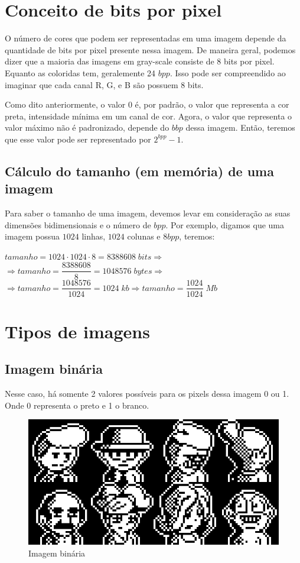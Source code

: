 \documentclass[a4paper, 12pt]{article}
\begin{document}
\section{Conceito de bits por pixel}
O número de cores que podem ser representadas em uma imagem depende da quantidade de bits por pixel presente nessa imagem.
De maneira geral, podemos dizer que a maioria das imagens em gray-scale consiste de 8 bits por pixel. Equanto as coloridas tem, geralemente 
24 $bpp$. Isso pode ser compreendido ao imaginar que cada canal R, G, e B são possuem 8 bits.

Como dito anteriormente, o valor 0 é, por padrão, o valor que representa a cor preta, intensidade mínima em um canal de cor. 
Agora, o valor que representa o valor máximo não é padronizado, depende do $bbp$ dessa imagem. Então, teremos que esse valor pode ser 
representado por $2^{bpp} - 1$.

\subsection{Cálculo do tamanho (em memória) de uma imagem}
Para saber o tamanho de uma imagem, devemos levar em consideração as suas dimensões bidimensionais e o número de $bpp$. Por exemplo, digamos que 
uma imagem possua $1024$ linhas, $1024$ colunas e $8 bpp$, teremos:
\begin{center}
	$tamanho = 1024 \cdot 1024 \cdot 8 = 8388608 \; bits  \Rightarrow$ 
	\\
	\vspace*{0.15cm}
	$\Rightarrow tamanho = \dfrac{8388608}{8} = 1048576 \; bytes  \Rightarrow$ 
	\\
	$\Rightarrow tamanho = \dfrac{1048576}{1024} = 1024\;kb \Rightarrow tamanho = \dfrac{1024}{1024}\;Mb $
\end{center}

\section{Tipos de imagens}
\subsection{Imagem binária}
Nesse caso, há somente 2 valores possíveis para os pixels dessa imagem 0 ou 1. Onde 0 representa o preto e 1 o branco.
\begin{figure}[!htbp]
	\centering
	\includegraphics[scale=0.5]{images/binaria.png}
	\caption{Imagem binária}
\end{figure}
\end{document}
